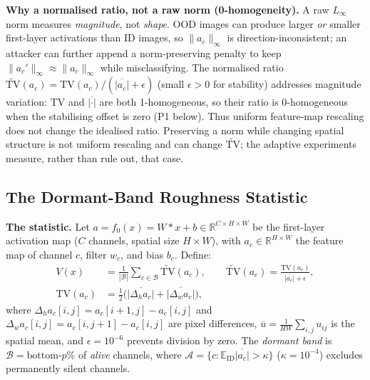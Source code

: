 \documentclass[10pt,letterpaper,journal]{IEEEtran}
\newcommand{\rev}[1]{#1}
\begin{document}
\noindent\rev{\textbf{Why a normalised ratio, not a raw norm (0-homogeneity).}
A raw $L_\infty$ norm measures \emph{magnitude}, not \emph{shape}.  OOD images
can produce larger \emph{or} smaller first-layer activations than ID images, so
$\|a_c\|_\infty$ is direction-inconsistent; an attacker can further append a
norm-preserving penalty to keep $\|a_c'\|_\infty\!\approx\!\|a_c\|_\infty$ while
misclassifying.  The normalised ratio
$\widetilde{\mathrm{TV}}(a_c)=\mathrm{TV}(a_c)/(\overline{|a_c|}+\epsilon)$
(small $\epsilon>0$ for stability) addresses magnitude variation: TV and
$\overline{|\cdot|}$ are both 1-homogeneous, so their ratio is 0-homogeneous
when the stabilising offset is zero (P1 below). Thus uniform feature-map
rescaling does not change the idealised ratio. Preserving a norm while changing
spatial structure is not uniform rescaling and can change
$\widetilde{\mathrm{TV}}$; the adaptive experiments measure, rather than rule
out, that case.}




\subsection{The Dormant-Band Roughness Statistic}
\label{ssec:shape_theory}

\noindent\textbf{The statistic.}
Let $a = f_0(x) = W\!\ast x + b \in \mathbb{R}^{C\times H\times W}$ be the
first-layer activation map ($C$ channels, spatial size $H{\times}W$), with
$a_c \in \mathbb{R}^{H\times W}$ the feature map of channel $c$, filter $w_c$, and
bias $b_c$.  Define:
\begin{equation}
\begin{aligned}
V(x) &= \frac{1}{|\mathcal{B}|}\sum_{c\in\mathcal{B}}\widetilde{\mathrm{TV}}(a_c),
\qquad
\widetilde{\mathrm{TV}}(a_c)=\frac{\mathrm{TV}(a_c)}{\overline{|a_c|}+\epsilon},\\
\mathrm{TV}(a_c) &= \tfrac12\bigl(\overline{|\Delta_h a_c|}+\overline{|\Delta_w a_c|}\bigr),
\end{aligned}
\label{eq:vdef}
\end{equation}
where $\Delta_h a_c[i,j]{=}a_c[i{+}1,j]{-}a_c[i,j]$ and
$\Delta_w a_c[i,j]{=}a_c[i,j{+}1]{-}a_c[i,j]$ are pixel differences,
$\overline{u}=\tfrac1{HW}\sum_{i,j}u_{ij}$ is the spatial mean,
and $\epsilon=10^{-6}$ prevents division by zero.
The \emph{dormant band} is
$\mathcal{B}=\text{bottom-}p\%$ of \emph{alive} channels, where
$\mathcal{A}=\{c:\mathbb{E}_{\mathrm{ID}}\overline{|a_c|}>\kappa\}$
($\kappa=10^{-4}$) excludes permanently silent channels.
\end{document}
